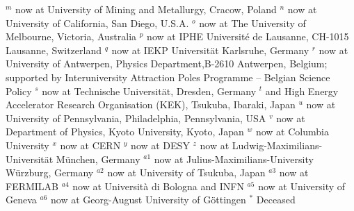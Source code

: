 {\newline
$^{  m}$ now at University of Mining and Metallurgy, Cracow, Poland
\newline
$^{  n}$ now at University of California, San Diego, U.S.A.
\newline
$^{  o}$ now at The University of Melbourne, Victoria, Australia
\newline
$^{  p}$ now at IPHE Universit\'e de Lausanne, CH-1015 Lausanne, Switzerland
\newline
$^{  q}$ now at IEKP Universit\"at Karlsruhe, Germany
\newline
$^{  r}$ now at University of Antwerpen, Physics Department,B-2610 Antwerpen, 
Belgium; supported by Interuniversity Attraction Poles Programme -- Belgian
Science Policy
\newline
$^{  s}$ now at Technische Universit\"at, Dresden, Germany
\newline
$^{  t}$ and High Energy Accelerator Research Organisation (KEK), Tsukuba,
Ibaraki, Japan
\newline
$^{  u}$ now at University of Pennsylvania, Philadelphia, Pennsylvania, USA
\newline
$^{  v}$ now at Department of Physics, Kyoto University, Kyoto, Japan
\newline
$^{  w}$ now at Columbia University
\newline
$^{  x}$ now at CERN
\newline
$^{  y}$ now at DESY
\newline
$^{ z}$ now at Ludwig-Maximilians-Universit\"at M\"unchen, Germany
\newline
$^{ a1}$ now at Julius-Maximilians-University W\"urzburg, Germany
\newline
$^{ a2}$ now at University of Tsukuba, Japan
\newline
$^{ a3}$ now at FERMILAB
\newline
$^{ a4}$ now at Universit\`a di Bologna and INFN
\newline
$^{ a5}$ now at University of Geneva
\newline
$^{ a6}$ now at Georg-August University of G\"{o}ttingen
\newline
$^{  *}$ Deceased

\newpage
}
